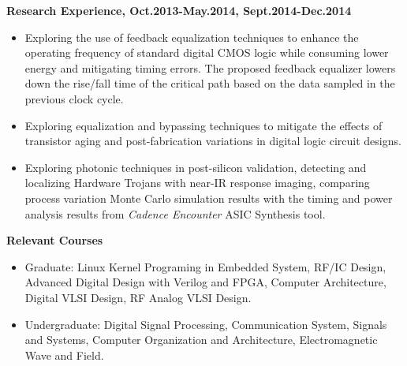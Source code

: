\documentclass[]{article}
\begin{document}
\noindent \textbf{Research Experience, Oct.2013-May.2014, Sept.2014-Dec.2014}
		\begin{itemize}
            \item Exploring the use of feedback equalization techniques to
            enhance the operating frequency of standard digital CMOS logic
            while consuming lower energy and mitigating timing errors. The
            proposed feedback equalizer lowers down the rise/fall time of
            the critical path based on the data sampled in the previous
            clock cycle. 

            \item Exploring equalization and bypassing techniques to mitigate
            the effects of transistor aging and post-fabrication
            variations in digital logic circuit designs.

            \item Exploring photonic techniques in post-silicon validation,
            detecting and localizing Hardware Trojans with near-IR response
            imaging, comparing process variation Monte Carlo simulation results
            with the timing and power analysis results from \textit{Cadence
            Encounter} ASIC Synthesis tool. 
		\end{itemize}

\noindent \textbf{Relevant Courses}
\begin{itemize}
\item Graduate:
                    Linux Kernel Programing in Embedded System, RF/IC Design,
                    Advanced Digital Design with Verilog and FPGA, Computer
                    Architecture, Digital VLSI Design, RF Analog VLSI Design. 
\item Undergraduate:
                    Digital Signal Processing, Communication System, Signals
                    and Systems, Computer Organization and 
                    Architecture, Electromagnetic Wave and Field. 
\end{itemize}

\end{document}
